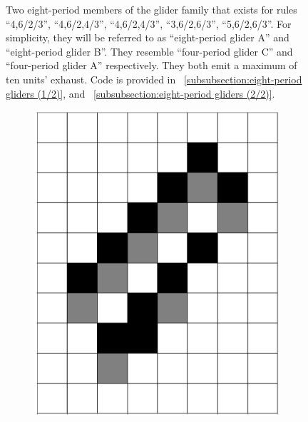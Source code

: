 \documentclass[12pt]{article}
\numberwithin{figure}{section} %
\begin{document}
\begin{figure}[H]
\begin{subfigure}{0.3\textwidth}
     		\subcaption{}
   	\end{subfigure}
   	\setcounter{subfigure}{0}
   	\caption[Eight-period gliders]{Two eight-period members of the glider family that exists for rules “4,6/2/3”, “4,6/2,4/3”, “4,6/2,4/3”, “3,6/2,6/3”, “5,6/2,6/3”. For simplicity, they will be referred to as “eight-period glider A” and “eight-period glider B”. They resemble “four-period glider C” and “four-period glider A” respectively. They both emit a maximum of ten units’ exhaust.  Code is provided in ~\ref{subsubsection:eight-period gliders (1/2)}, and ~\ref{subsubsection:eight-period gliders (2/2)}. }
   	\label{fig:eight-period gliders}
   	\vspace{-1.5em}
\end{figure}

\begin{figure}[H]
	\centering
 	\begin{subfigure}{0.2\textwidth}
     		\centering
     		\includegraphics[angle=270,width=\linewidth]{Section4/24.0}
     		\subcaption{}
   	\end{subfigure}

\end{figure}
\end{document}
